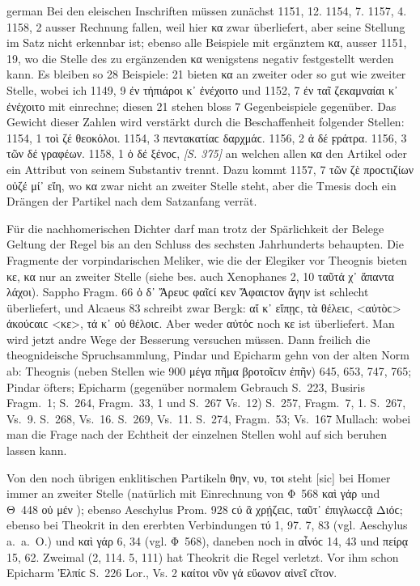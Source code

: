 \begin{otherlanguage*}{german}
Bei den eleischen Inschriften müssen zunächst 1151, 12. 1154, 7. 1157, 4. 1158, 2 ausser Rechnung fallen, weil hier κα zwar überliefert, aber seine Stellung im Satz nicht erkennbar ist; ebenso alle Beispiele mit ergänztem κα, ausser 1151, 19, wo die Stelle des zu ergänzenden κα wenigstens negativ festgestellt werden kann. Es bleiben so 28 Beispiele: 21 bieten κα an zweiter oder so gut wie zweiter Stelle, wobei ich 1149, 9 ἐν τἠπιάροι κ᾽ ἐνέχοιτο und 1152, 7 ἐν ταῖ ζεκαμναίαι κ᾽ ἐνέχοιτο mit einrechne; diesen 21 stehen bloss 7 Gegenbeispiele gegenüber. Das Gewicht dieser Zahlen wird verstärkt durch die Beschaffenheit folgender Stellen: 1154, 1 τοὶ ζέ  θεοκόλοι. 1154, 3 πεντακατίαϲ  δαρχμάϲ. 1156, 2 ἀ δέ  ϝράτρα. 1156, 3 τῶν δέ  γραφέων. 1158, 1 ὀ δέ  ξένοϲ, \hypertarget{p375}{\emph{[S. 375]}}\label{p375} an welchen allen κα den Artikel oder ein Attribut von seinem Substantiv trennt. Dazu kommt 1157, 7 τῶν ζὲ προϲτιζίων οὐζέ  μί᾽ εἴη, wo κα zwar nicht an zweiter Stelle steht, aber die Tmesis doch ein Drängen der Partikel nach dem Satzanfang verrät.

Für die nachhomerischen Dichter darf man trotz der Spärlichkeit der Belege Geltung der Regel bis an den Schluss des sechsten Jahrhunderts behaupten. Die Fragmente der vorpindarischen Meliker, wie die der Elegiker vor Theognis bieten κε, κα nur an zweiter Stelle (siehe bes. auch Xenophanes 2, 10 ταῦτά χ᾽ ἅπαντα λάχοι). Sappho Fragm. 66 ὀ δ᾽ Ἄρευϲ φαῖϲί κεν Ἄφαιϲτον ἄγην ist schlecht überliefert, und Alcaeus 83 schreibt zwar Bergk: αἴ κ᾽ εἴπῃϲ, τὰ θέλειϲ, <αὐτὸϲ> ἀκούϲαιϲ <κε>, τά κ᾽ οὐ θέλοιϲ. Aber weder αὐτόϲ noch κε ist überliefert. Man wird jetzt andre Wege der Besserung versuchen müssen. Dann freilich die theognideische Spruchsammlung, Pindar und Epicharm gehn von der alten Norm ab: Theognis (neben Stellen wie 900 μέγα  πῆμα βροτοῖϲιν ἐπῆν) 645, 653, 747, 765; Pindar öfters; Epicharm (gegenüber normalem Gebrauch S.~223, Busiris Fragm.~1; S.~264, Fragm.~33, 1 und S.~267 Vs.~12) S.~257, Fragm.~7, 1. S.~267, Vs.~9. S.~268, Vs.~16. S.~269, Vs.~11. S.~274, Fragm.~53; Vs.~167 Mullach: wobei man die Frage nach der Echtheit der einzelnen Stellen wohl auf sich beruhen lassen kann.

Von den noch übrigen enklitischen Partikeln θην, νυ, τοι steht  [sic] bei Homer immer an zweiter Stelle (natürlich mit Einrechnung von Φ~568 καὶ γάρ  und Θ~448 οὐ μέν ); ebenso Aeschylus Prom. 928 ϲύ  ἃ χρῄζειϲ, ταῦτ᾽ ἐπιγλωϲϲᾷ Διόϲ; ebenso bei Theokrit in den ererbten Verbindungen τύ  1, 97. 7, 83 (vgl. Aeschylus a.~a.~O.) und καὶ γάρ  6, 34 (vgl. Φ~568), daneben noch in αἶνόϲ  14, 43 und πείρᾳ  15, 62. Zweimal (2, 114. 5, 111) hat Theokrit die Regel verletzt. Vor ihm schon Epicharm Ἐλπίϲ S.~226 Lor., Vs. 2 καίτοι νῦν γά  εὔωνον αἰνεῖ ϲῖτον.


\end{otherlanguage*}
